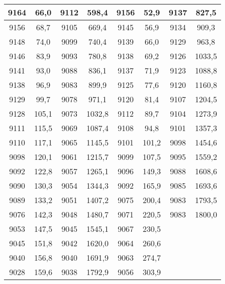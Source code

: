 \documentclass[11pt]{article}
\begin{document}
{{\begin{tabular}{|c|c|c|c|c|c|c|c|}
            \hline 
            9164 & 66,0 & 9112 & 598,4 & 9156 & 52,9 & \multicolumn{1}{c|}{9137} & \multicolumn{1}{c|}{827,5}\tabularnewline
            \hline 
            9156 & 68,7 & 9105 & 669,4 & 9145 & 56,9 & \multicolumn{1}{c|}{9134} & \multicolumn{1}{c|}{909,3}\tabularnewline
            \hline 
            9148 & 74,0 & 9099 & 740,4 & 9139 & 66,0 & \multicolumn{1}{c|}{9129} & \multicolumn{1}{c|}{963,8}\tabularnewline
            \hline 
            9146 & 83,9 & 9093 & 780,8 & 9138 & 69,2 & \multicolumn{1}{c|}{9126} & \multicolumn{1}{c|}{1033,5}\tabularnewline
            \hline 
            9141 & 93,0 & 9088 & 836,1 & 9137 & 71,9 & \multicolumn{1}{c|}{9123} & \multicolumn{1}{c|}{1088,8}\tabularnewline
            \hline 
            9138 & 96,9 & 9083 & 899,9 & 9125 & 77,6 & \multicolumn{1}{c|}{9120} & \multicolumn{1}{c|}{1160,8}\tabularnewline
            \hline 
            9129 & 99,7 & 9078 & 971,1 & 9120 & 81,4 & \multicolumn{1}{c|}{9107} & \multicolumn{1}{c|}{1204,5}\tabularnewline
            \hline 
            9128 & 105,1 & 9073 & 1032,8 & 9112 & 89,7 & \multicolumn{1}{c|}{9104} & \multicolumn{1}{c|}{1273,9}\tabularnewline
            \hline 
            9111 & 115,5 & 9069 & 1087,4 & 9108 & 94,8 & \multicolumn{1}{c|}{9101} & \multicolumn{1}{c|}{1357,3}\tabularnewline
            \hline 
            9110 & 117,1 & 9065 & 1145,5 & 9101 & 101,2 & \multicolumn{1}{c|}{9098} & \multicolumn{1}{c|}{1454,6}\tabularnewline
            \hline 
            9098 & 120,1 & 9061 & 1215,7 & 9099 & 107,5 & \multicolumn{1}{c|}{9095} & \multicolumn{1}{c|}{1559,2}\tabularnewline
            \hline 
            9092 & 122,8 & 9057 & 1265,1 & 9096 & 149,3 & \multicolumn{1}{c|}{9088} & \multicolumn{1}{c|}{1608,6}\tabularnewline
            \hline 
            9090 & 130,3 & 9054 & 1344,3 & 9092 & 165,9 & \multicolumn{1}{c|}{9085} & \multicolumn{1}{c|}{1693,6}\tabularnewline
            \hline 
            9089 & 133,2 & 9051 & 1407,2 & 9075 & 200,4 & \multicolumn{1}{c|}{9083} & \multicolumn{1}{c|}{1793,5}\tabularnewline
            \hline 
            9076 & 142,3 & 9048 & 1480,7 & 9071 & 220,5 & \multicolumn{1}{c|}{9083} & \multicolumn{1}{c|}{1800,0}\tabularnewline
            \hline 
            9053 & 147,5 & 9045 & 1545,1 & 9067 & 230,5 &  & \tabularnewline
            \cline{1-6} 
            9045 & 151,8 & 9042 & 1620,0 & 9064 & 260,6 &  & \tabularnewline
            \cline{1-6} 
            9040 & 156,8 & 9040 & 1691,9 & 9063 & 274,7 &  & \tabularnewline
            \cline{1-6} 
            9028 & 159,6 & 9038 & 1792,9 & 9056 & 303,9 &  & \tabularnewline

\end{tabular}}}
\end{document}

